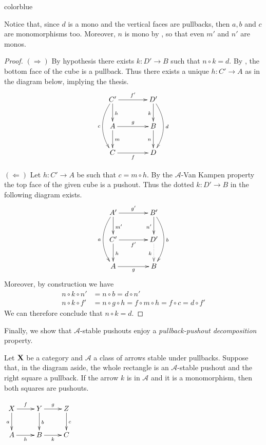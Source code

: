 \documentclass[a4paper,UKenglish,cleveref,pdftex,thm-restate,numberwithinsect]{lipics-v2021}
\newcommand{\full}[1]{{color{blue}#1}}
\newcommand{\full}[1]{}
\def\X{\textbf {\textup{X}}}
\begin{document}
\full{ 
\begin{remark}
	Notice that, since $d$ is a mono and the vertical faces are pullbacks, then $a, b$ and $c$ are monomorphisms too. Moreover, $n$ is mono by \Cref{prop:pbpo}, so that even $m'$ and $n'$ are monos.
\end{remark}

\begin{proof}
	$(\Rightarrow)$ By hypothesis there exists $k:D'\to B$ such that $n\circ k = d$. By \Cref{prop:pbpo}, the bottom face of the cube is a pullback. Thus there exists a unique $h:C'\to A$ as in the diagram below, implying the thesis.
	\[\xymatrix@C=40pt{C'  \ar[d]^{h}\ar[r]^{f'} \ar@/_.5cm/[dd]_{c}& D' \ar@/^.5cm/[dd]^{d}\ar[d]_{k}\\ A \ar[d]^{m} \ar[r]^{g} & B \ar[d]_{n} \\  C \ar[r]_f & D}\]

	\smallskip \noindent
	$(\Leftarrow)$ Let $h:C'\to A$ be such that $c=m\circ h$. By the $\mathcal{A}$-Van Kampen property the top face of the given cube is a pushout. Thus the dotted $k:D'\to B$ in the following diagram exists.
	\[\xymatrix@C=40pt{A' \ar@/_.5cm/[dd]_{a} \ar[d]^{m'} \ar[r]^{g'} & B' \ar[d]_{n'} \ar@/^.5cm/[dd]^{b} \\  C' \ar[d]^{h} \ar[r]_{f'} & D' \ar@{.>}[d]_{k}\\ A \ar[r]_g& B }\]
	Moreover, by construction we have
	\begin{align*}
		n\circ k \circ n' & = n\circ b=d\circ n'                                  \\
		n\circ k \circ f' & = n\circ g\circ h=f\circ m\circ h=f\circ c= d\circ f'
	\end{align*}
	We can therefore conclude that $n\circ k =d$.
\end{proof}}

Finally, we show that $\mathcal{A}$-stable pushouts enjoy a \emph{pullback-pushout decomposition} property.

\noindent 
\parbox{10cm}{
\begin{proposition}\label{prop:stab}Let $\X$ be a category and $\mathcal{A}$ a class of arrows stable under pullbacks. Suppose that, in the diagram aside, the whole rectangle is an $\mathcal{A}$-stable pushout and the right square a pullback. If the arrow $k$ is in $\mathcal{A}$ and it is a monomorphism,  then both squares are pushouts.
\end{proposition}}
\parbox{4cm}{\vspace{-.3cm}
	$\xymatrix{X \ar[d]_{a} \ar[r]^{f}& \ar[r]^{g} Y \ar[d]^{b}& Z \ar[d]^{c}\\ A \ar[r]_{h}& B \ar[r]_{k}& C}$}
\end{document}
